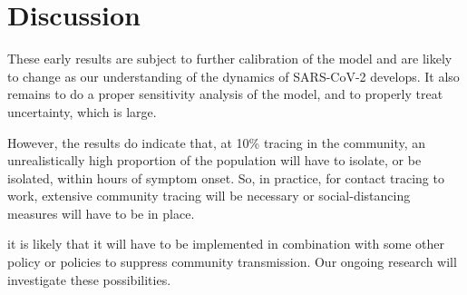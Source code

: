 \documentclass{article}
\begin{document}
\section{Discussion}

These early results are subject to further calibration of the model and are likely to change as our understanding of the dynamics of SARS-CoV-2 develops. It also remains to do a proper sensitivity analysis of the model, and to properly treat uncertainty, which is large.

However, the results do indicate that, at 10\% tracing in the community, an unrealistically high proportion of the population will have to isolate, or be isolated, within hours of symptom onset. So, in practice, for contact tracing to work, extensive community tracing will be necessary or social-distancing measures will have to be in place.




 it is likely that it will have to be implemented in combination with some other policy or policies to suppress community transmission. Our ongoing research will investigate these possibilities.

\pagebreak
%
% 


\end{document}

